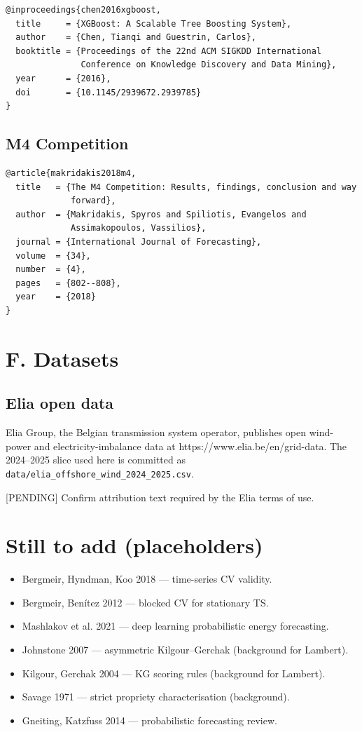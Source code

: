 \documentclass[11pt,a4paper,openany]{report}
\begin{document}
\begin{verbatim}
@inproceedings{chen2016xgboost,
  title     = {XGBoost: A Scalable Tree Boosting System},
  author    = {Chen, Tianqi and Guestrin, Carlos},
  booktitle = {Proceedings of the 22nd ACM SIGKDD International
               Conference on Knowledge Discovery and Data Mining},
  year      = {2016},
  doi       = {10.1145/2939672.2939785}
}
\end{verbatim}

\subsection{M4 Competition}

\begin{verbatim}
@article{makridakis2018m4,
  title   = {The M4 Competition: Results, findings, conclusion and way
             forward},
  author  = {Makridakis, Spyros and Spiliotis, Evangelos and
             Assimakopoulos, Vassilios},
  journal = {International Journal of Forecasting},
  volume  = {34},
  number  = {4},
  pages   = {802--808},
  year    = {2018}
}
\end{verbatim}

\section{F. Datasets}

\subsection{Elia open data}

Elia Group, the Belgian transmission system operator, publishes
open wind-power and electricity-imbalance data at
https://www.elia.be/en/grid-data. The 2024–2025 slice used here is
committed as \texttt{data/elia\_offshore\_wind\_2024\_2025.csv}.

[PENDING] Confirm attribution text required by the Elia terms of use.

\section{Still to add (placeholders)}

\begin{itemize}
  \item Bergmeir, Hyndman, Koo 2018 — time-series CV validity.
  \item Bergmeir, Benítez 2012 — blocked CV for stationary TS.
  \item Mashlakov et al. 2021 — deep learning probabilistic energy
    forecasting.
  \item Johnstone 2007 — asymmetric Kilgour–Gerchak (background for
    Lambert).
  \item Kilgour, Gerchak 2004 — KG scoring rules (background for Lambert).
  \item Savage 1971 — strict propriety characterisation (background).
  \item Gneiting, Katzfuss 2014 — probabilistic forecasting review.
\end{itemize}
\end{document}
